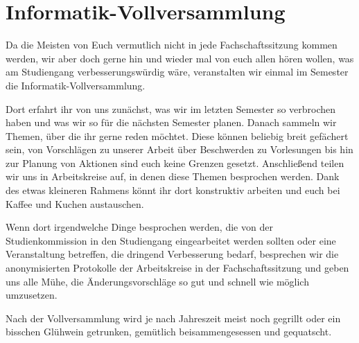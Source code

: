 \section{Informatik-Vollversammlung}

Da die Meisten von Euch vermutlich nicht in jede Fachschaftssitzung kommen werden, wir aber doch gerne hin und wieder mal von euch allen hören wollen, was am Studiengang verbesserungswürdig wäre, veranstalten wir einmal im Semester die Informatik-Vollversammlung.

Dort erfahrt ihr von uns zunächst, was wir im letzten Semester so verbrochen haben und was wir so für die nächsten Semester planen. Danach sammeln wir Themen, über die ihr gerne reden möchtet. Diese können beliebig breit gefächert sein, von Vorschlägen zu unserer Arbeit über Beschwerden zu Vorlesungen bis hin zur Planung von Aktionen sind euch keine Grenzen gesetzt. Anschließend teilen wir uns in Arbeitskreise auf, in denen diese Themen besprochen werden. Dank des etwas kleineren Rahmens könnt ihr dort konstruktiv arbeiten und euch bei Kaffee und Kuchen austauschen.

Wenn dort irgendwelche Dinge besprochen werden, die von der Studienkommission in den Studiengang eingearbeitet werden sollten oder eine Veranstaltung betreffen, die dringend Verbesserung bedarf, besprechen wir die anonymisierten Protokolle der Arbeitskreise in der Fachschaftssitzung und geben uns alle Mühe, die Änderungsvorschläge so gut und schnell wie möglich umzusetzen.

Nach der Vollversammlung wird je nach Jahreszeit meist noch gegrillt oder ein bisschen Glühwein getrunken, gemütlich beisammengesessen und gequatscht.
